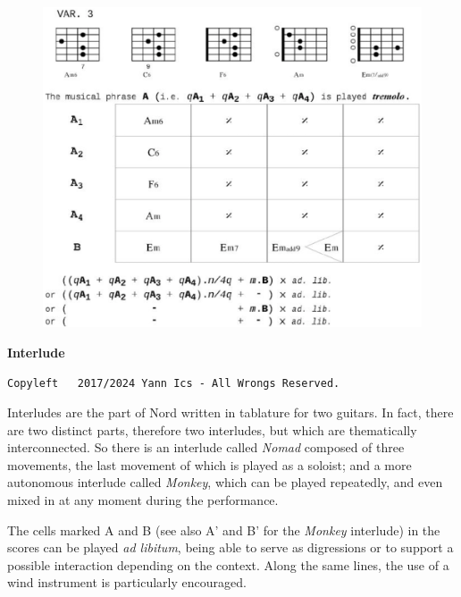  \begin{figure}[H]
\begin{center}
\includegraphics[scale=0.66]{img/tn2}
\end{center}
\end{figure}

\bigskip

\begin{center} 
\textbf{Interlude}
\label{interlude}

{\scriptsize  \texttt{Copyleft \textcopyleft \, 2017/2024 Yann Ics - All Wrongs Reserved.}}
 \end{center} 

\bigskip

Interludes are the part of Nord written in tablature for two guitars. In fact, there are two distinct parts, therefore two interludes, but which are thematically interconnected. So there is an interlude called \textsl{Nomad} composed of three movements, the last movement of which is played as a soloist; and a more autonomous interlude called \textsl{Monkey}, which can be played repeatedly, and even mixed in at any moment during the performance. 

\bigskip 

The cells marked A and B (see also A' and B' for the \textsl{Monkey} interlude) in the scores can be played \textit{ad libitum}, being able to serve as digressions or to support a possible interaction depending on the context. Along the same lines, the use of a wind instrument is particularly encouraged.

